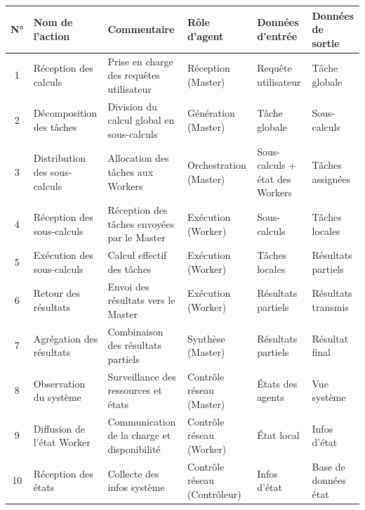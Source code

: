 \documentclass[12pt,a4paper]{report}
\theoremstyle{definition}
\begin{document}
\begin{table}[H]
\centering
\renewcommand{\arraystretch}{1.3}
\begin{tabular}{|c|p{3cm}|p{4cm}|p{3cm}|p{2cm}|p{2cm}|}
\hline
\textbf{N°} & \textbf{Nom de l’action} & \textbf{Commentaire} & \textbf{Rôle d’agent} & \textbf{Données d’entrée} & \textbf{Données de sortie} \\
\hline

1 & Réception des calculs & Prise en charge des requêtes utilisateur & Réception (Master) & Requête utilisateur & Tâche globale \\
\hline

2 & Décomposition des tâches & Division du calcul global en sous-calculs & Génération (Master) & Tâche globale & Sous-calculs \\
\hline

3 & Distribution des sous-calculs & Allocation des tâches aux Workers & Orchestration (Master) & Sous-calculs + état des Workers & Tâches assignées \\
\hline

4 & Réception des sous-calculs & Réception des tâches envoyées par le Master & Exécution (Worker) & Sous-calculs & Tâches locales \\
\hline

5 & Exécution des sous-calculs & Calcul effectif des tâches & Exécution (Worker) & Tâches locales & Résultats partiels \\
\hline

6 & Retour des résultats & Envoi des résultats vers le Master & Exécution (Worker) & Résultats partiels & Résultats transmis \\
\hline

7 & Agrégation des résultats & Combinaison des résultats partiels & Synthèse (Master) & Résultats partiels & Résultat final \\
\hline

8 & Observation du système & Surveillance des ressources et états & Contrôle réseau (Master) & États des agents & Vue système \\
\hline

9 & Diffusion de l’état Worker & Communication de la charge et disponibilité & Contrôle réseau (Worker) & État local & Infos d’état \\
\hline

10 & Réception des états & Collecte des infos système & Contrôle réseau (Contrôleur) & Infos d’état & Base de données état \\
\hline


\end{tabular}
\end{table}
\end{document}
